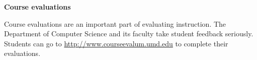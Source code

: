 \documentclass[11pt]{article}
\begin{document}
\medskip

{\bf Course evaluations}

Course evaluations are an important part of evaluating instruction.  The Department of Computer Science and its faculty take student feedback seriously.  Students can go to \url{http://www.courseevalum.umd.edu} to complete their evaluations.




\end{document}
